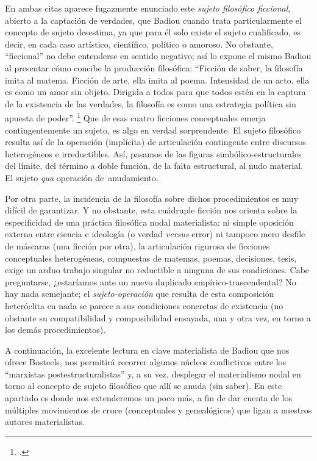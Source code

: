 En ambas citas aparece fugazmente enunciado este \emph{sujeto filosófico ficcional}, abierto a la captación de verdades, que Badiou cuando trata particularmente el concepto de sujeto desestima, ya que para él solo existe el sujeto cualificado, es decir, en cada caso artístico, científico, político o amoroso. No obstante, \enquote{ficcional} no debe entenderse en sentido negativo; así lo expone el mismo Badiou al presentar cómo concibe la producción filosófica: \enquote{Ficción de saber, la filosofía imita al matema. Ficción de arte, ella imita al poema. Intensidad de un acto, ella es como un amor sin objeto. Dirigida a todos para que todos estén en la captura de la existencia de las verdades, la filosofía es como una estrategia política sin apuesta de poder}. \footcite[71]{@7072-BADIOU2002} Que de esas cuatro ficciones conceptuales  emerja contingentemente un sujeto, es algo en verdad sorprendente. El sujeto filosófico resulta así de la operación (implícita) de articulación contingente entre discursos heterogéneos e irreductibles. Así, pasamos de las figuras simbólico-estructurales del límite, del término a doble función, de la falta estructural, al nudo material. El sujeto \emph{qua} operación de~anudamiento.


Por otra parte, la incidencia de la filosofía sobre dichos procedimientos es muy difícil  de garantizar. Y no obstante, esta cuádruple ficción nos orienta sobre la especificidad de una práctica filosófica nodal materialista: ni simple oposición externa entre ciencia e ideología (o verdad \emph{versus} error) ni tampoco mero desfile de máscaras (una ficción por otra), la articulación rigurosa de ficciones conceptuales heterogéneas, compuestas de matemas, poemas, decisiones, tesis, exige un arduo trabajo singular no reductible a ninguna de sus condiciones. Cabe preguntarse, ¿estaríamos ante un nuevo duplicado empírico-trascendental? No hay nada semejante; el \emph{sujeto-operación} que resulta de esta composición heteróclita en nada se parece a sus condiciones concretas de existencia (no obstante su compatibilidad y composibilidad ensayada, una y otra vez, en torno a los demás procedimientos).

A continuación, la excelente lectura en clave materialista de Badiou que nos ofrece Bosteels, nos permitirá recorrer algunos núcleos conflictivos entre los \enquote{marxistas postestructuralistas} y, a su vez, desplegar el materialismo nodal en torno al concepto de sujeto filosófico que allí se anuda (sin saber). En este apartado es donde nos extenderemos un poco más, a fin de dar cuenta de los múltiples movimientos de cruce (conceptuales y genealógicos) que ligan a nuestros autores materialistas.

